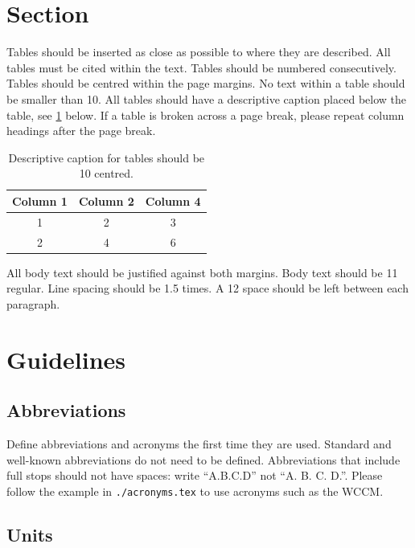 \documentclass[a4paper,11pt]{article}
\begin{document}
\section{Section}

Tables should be inserted as close as possible to where they are described. All
tables must be cited within the text. Tables should be numbered consecutively.
Tables should be centred within the page margins. No text within a table should
be smaller than \qty{10}{\point}. All tables should have a descriptive caption 
placed below the table, see \cref{tab:bad} below. If a table is broken across a
page break, please repeat column headings after the page break.

\begin{table}[h]
  \centering
  \begin{tabular}{| c | c | c |}
    \hline
    Column 1 & Column 2 & Column 4 \\
    \hline
    1 & 2 & 3 \\
    \hline
    2 & 4 & 6 \\
    \hline
  \end{tabular}
  \caption{Descriptive caption for tables should be \qty{10}{\point} centred.
  }\label{tab:bad}
\end{table}

All body text should be justified against both margins. Body text should be
\qty{11}{\point} regular. Line spacing should be \num{1.5} times. A
\qty{12}{\point} space should be left between each paragraph. 

\section{Guidelines}

\subsection{Abbreviations}

Define abbreviations and acronyms the first time they are used. Standard and
well-known abbreviations do not need to be defined. Abbreviations that include
full stops should not have spaces: write ``A.B.C.D'' not ``A. B. C. D.''. 
Please follow the example in \texttt{./acronyms.tex} to use acronyms such as
the \ac{WCCM}.

\subsection{Units}
\end{document}
